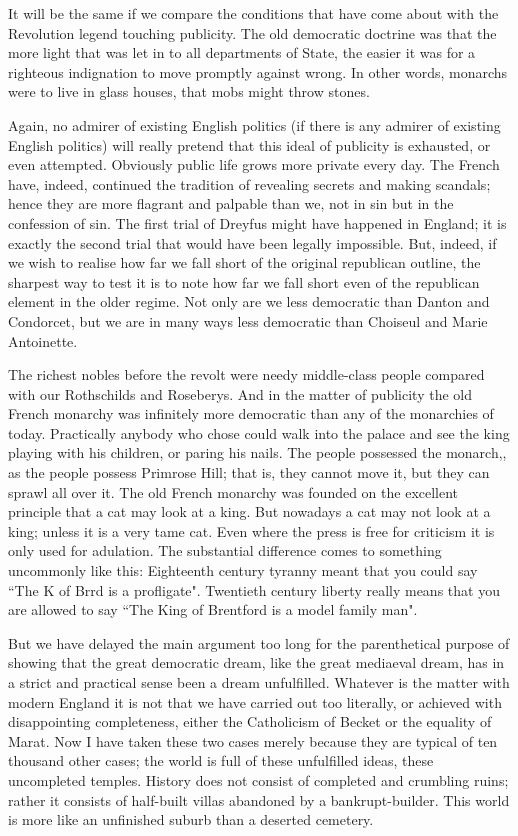 \documentclass[final,10pt,letterpaper,twocolumn,openany]{book}
\begin{document}
It will be the same if we compare the conditions that have come about
with the Revolution legend touching publicity. The old democratic
doctrine was that the more light that was let in to all departments of State,
the easier it was for a righteous indignation to move promptly against
wrong. In other words, monarchs were to live in glass houses, that mobs
might throw stones. 

Again, no admirer of existing English politics (if there
is any admirer of existing English politics) will really pretend that this
ideal of publicity is exhausted, or even attempted. Obviously public life
grows more private every day. The French have, indeed, continued the
tradition of revealing secrets and making scandals; hence they are more
flagrant and palpable than we, not in sin but in the confession of sin. The
first trial of Dreyfus might have happened in England; it is exactly the
second trial that would have been legally impossible. But, indeed, if we
wish to realise how far we fall short of the original republican outline, the
sharpest way to test it is to note how far we fall short even of the
republican element in the older regime. Not only are we less democratic
than Danton and Condorcet, but we are in many ways less democratic than
Choiseul and Marie Antoinette. 

The richest nobles before the revolt were
needy middle-class people compared with our Rothschilds and Roseberys.
And in the matter of publicity the old French monarchy was infinitely
more democratic than any of the monarchies of today. Practically anybody
who chose could walk into the palace and see the king playing with his
children, or paring his nails. The people possessed the monarch,, as the
people possess Primrose Hill; that is, they cannot move it, but they can
sprawl all over it. The old French monarchy was founded on the excellent
principle that a cat may look at a king. But nowadays a cat may not look at
a king; unless it is a very tame cat. Even where the press is free for
criticism it is only used for adulation. The substantial difference comes to
something uncommonly like this: Eighteenth century tyranny meant that
you could say ``The K\underline{\hspace{.2cm}} of Br\underline{\hspace{.2cm}}rd is a profligate". Twentieth century
liberty really means that you are allowed to say ``The King of Brentford is
a model family man".

But we have delayed the main argument too long for the parenthetical
purpose of showing that the great democratic dream, like the great
mediaeval dream, has in a strict and practical sense been a dream
unfulfilled. Whatever is the matter with modern England it is not that we
have carried out too literally, or achieved with disappointing completeness,
either the Catholicism of Becket or the equality of Marat. Now I have
taken these two cases merely because they are typical of ten thousand
other cases; the world is full of these unfulfilled ideas, these uncompleted
temples. History does not consist of completed and crumbling ruins; rather
it consists of half-built villas abandoned by a bankrupt-builder. This world
is more like an unfinished suburb than a deserted cemetery.
\end{document}
